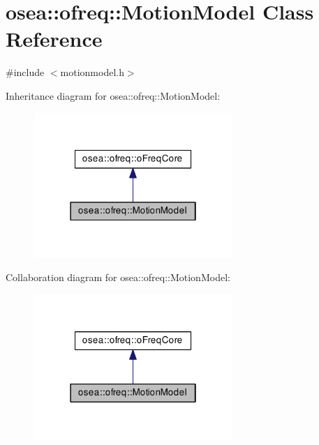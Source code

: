 \hypertarget{classosea_1_1ofreq_1_1_motion_model}{\section{osea\-:\-:ofreq\-:\-:Motion\-Model Class Reference}
\label{classosea_1_1ofreq_1_1_motion_model}
}


{\ttfamily \#include $<$motionmodel.\-h$>$}



Inheritance diagram for osea\-:\-:ofreq\-:\-:Motion\-Model\-:
\nopagebreak
\begin{figure}[H]
\begin{center}
\leavevmode
\includegraphics[width=214pt]{classosea_1_1ofreq_1_1_motion_model__inherit__graph}
\end{center}
\end{figure}


Collaboration diagram for osea\-:\-:ofreq\-:\-:Motion\-Model\-:
\nopagebreak
\begin{figure}[H]
\begin{center}
\leavevmode
\includegraphics[width=214pt]{classosea_1_1ofreq_1_1_motion_model__coll__graph}
\end{center}
\end{figure}
